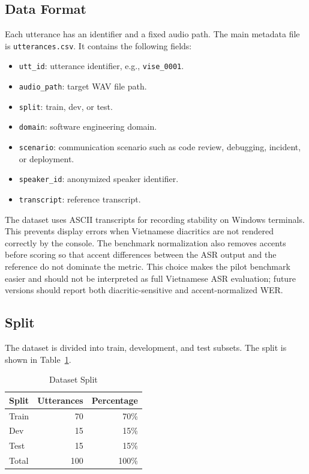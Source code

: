\documentclass[conference]{IEEEtran}
\begin{document}
\subsection{Data Format}
Each utterance has an identifier and a fixed audio path. The main metadata file is \texttt{utterances.csv}. It contains the following fields:
\begin{itemize}
\item \texttt{utt\_id}: utterance identifier, e.g., \texttt{vise\_0001}.
\item \texttt{audio\_path}: target WAV file path.
\item \texttt{split}: train, dev, or test.
\item \texttt{domain}: software engineering domain.
\item \texttt{scenario}: communication scenario such as code review, debugging, incident, or deployment.
\item \texttt{speaker\_id}: anonymized speaker identifier.
\item \texttt{transcript}: reference transcript.
\end{itemize}

The dataset uses ASCII transcripts for recording stability on Windows terminals. This prevents display errors when Vietnamese diacritics are not rendered correctly by the console. The benchmark normalization also removes accents before scoring so that accent differences between the ASR output and the reference do not dominate the metric. This choice makes the pilot benchmark easier and should not be interpreted as full Vietnamese ASR evaluation; future versions should report both diacritic-sensitive and accent-normalized WER.

\subsection{Split}
The dataset is divided into train, development, and test subsets. The split is shown in Table~\ref{tab:split}.

\begin{table}[htbp]
\caption{Dataset Split}
\begin{center}
\begin{tabular}{lrr}
\toprule
\textbf{Split} & \textbf{Utterances} & \textbf{Percentage} \\
\midrule
Train & 70 & 70\% \\
Dev & 15 & 15\% \\
Test & 15 & 15\% \\
\midrule
Total & 100 & 100\% \\
\bottomrule
\end{tabular}
\label{tab:split}
\end{center}
\end{table}
\end{document}
